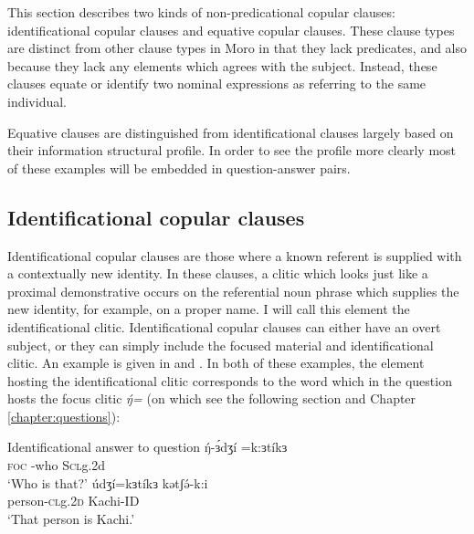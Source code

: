 This section describes two kinds of non-predicational copular clauses: identificational copular clauses and equative copular clauses. These clause types are distinct from other clause types in Moro in that they lack predicates, and also because they lack any elements which agrees with the subject. Instead, these clauses equate or identify two nominal expressions as referring to the same individual. 

Equative clauses are distinguished from identificational clauses largely based on their information structural profile. In order to see the profile more clearly most of these examples will be embedded in question-answer pairs.

		
\subsection{Identificational copular clauses}


Identificational copular clauses are those where a known referent is supplied with a contextually new identity. In these clauses, a clitic which looks just like a proximal demonstrative occurs on the referential noun phrase which supplies the new identity, for example, on a proper name. I will call this element the identificational clitic. Identificational copular clauses can either have an overt subject, or they can simply include the focused material and identificational clitic. An example is given in  and . In both of these examples, the element hosting the identificational clitic corresponds to the word which in the question hosts the focus clitic \textit{ŋ́=} (on which see the following section and Chapter \ref{chapter:questions}):

\ea Identificational answer to question \label{ex:copular:id1}
 	 \gll  	ŋ́-ɜ́dʒí 	=k:ɜtíkɜ	\\			
						 \textsc{foc} -who	   			S\textsc{cl}g.2d		\\
			\glt 	‘Who is that?’ 
	 \gll 	 	údʒí=kɜtíkɜ 		kətʃə́-k:i 	\\
		     		person-\textsc{cl}g.\textsc{2d} 		Kachi-ID		\\
		    \glt   ‘That person is Kachi.’
\z 

